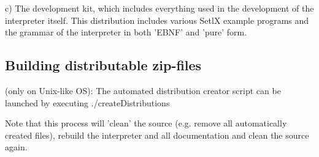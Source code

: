 c)  The development kit, which includes everything used in the development of
    the interpreter itself.
    This distribution includes various SetlX example programs and the grammar of
    the interpreter in both 'EBNF' and 'pure' form.

\subsection{Building distributable zip-files}
(only on Unix-like OS):
    The automated distribution creator script can be launched by executing
        ./createDistributions

    Note that this process will 'clean' the source (e.g. remove all automatically
    created files), rebuild the interpreter and all documentation and clean the source again.



